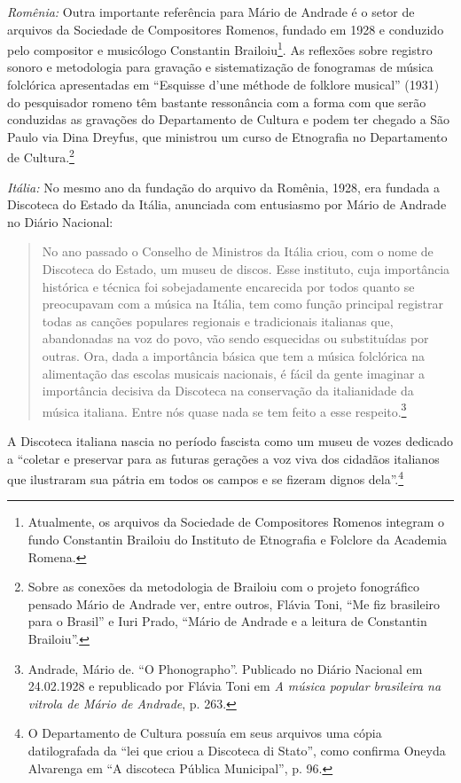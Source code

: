 \emph{Romênia:} Outra importante referência para Mário de Andrade é o
setor de arquivos da Sociedade de Compositores Romenos, fundado em 1928
e conduzido pelo compositor e musicólogo Constantin Brailoiu\footnote{Atualmente,
  os arquivos da Sociedade de Compositores Romenos integram o fundo
  Constantin Brailoiu do Instituto de Etnografia e Folclore da Academia
  Romena.}. As reflexões sobre registro sonoro e metodologia para
gravação e sistematização de fonogramas de música folclórica
apresentadas em ``Esquisse d'une méthode de folklore musical'' (1931) do
pesquisador romeno têm bastante ressonância com a forma com que serão
conduzidas as gravações do Departamento de Cultura e podem ter chegado a
São Paulo via Dina Dreyfus, que ministrou um curso de Etnografia no
Departamento de Cultura.\footnote{Sobre as conexões da metodologia de
  Brailoiu com o projeto fonográfico pensado Mário de Andrade ver, entre
  outros, Flávia Toni, ``Me fiz brasileiro para o Brasil'' e Iuri Prado,
  ``Mário de Andrade e a leitura de Constantin Brailoiu''.}

\emph{Itália:} No mesmo ano da fundação do arquivo da Romênia, 1928, era
fundada a Discoteca do Estado da Itália, anunciada com entusiasmo por
Mário de Andrade no Diário Nacional:

\begin{quote}
No ano passado o Conselho de Ministros da Itália criou, com o nome de
Discoteca do Estado, um museu de discos. Esse instituto, cuja
importância histórica e técnica foi sobejadamente encarecida por todos
quanto se preocupavam com a música na Itália, tem como função principal
registrar todas as canções populares regionais e tradicionais italianas
que, abandonadas na voz do povo, vão sendo esquecidas ou substituídas
por outras. Ora, dada a importância básica que tem a música folclórica
na alimentação das escolas musicais nacionais, é fácil da gente imaginar
a importância decisiva da Discoteca na conservação da italianidade da
música italiana. Entre nós quase nada se tem feito a esse
respeito.\footnote{Andrade, Mário de. ``O Phonographo''. Publicado no
  Diário Nacional em 24.02.1928 e republicado por Flávia Toni em \emph{A
  música popular brasileira na vitrola de Mário de Andrade}, p. 263.}
\end{quote}

A Discoteca italiana nascia no período fascista como um museu de vozes
dedicado a ``coletar e preservar para as futuras gerações a voz viva dos
cidadãos italianos que ilustraram sua pátria em todos os campos e se
fizeram dignos dela''.\footnote{O Departamento de Cultura possuía em
  seus arquivos uma cópia datilografada da ``lei que criou a Discoteca
  di Stato'', como confirma Oneyda Alvarenga em ``A discoteca Pública
  Municipal'', p. 96.}

